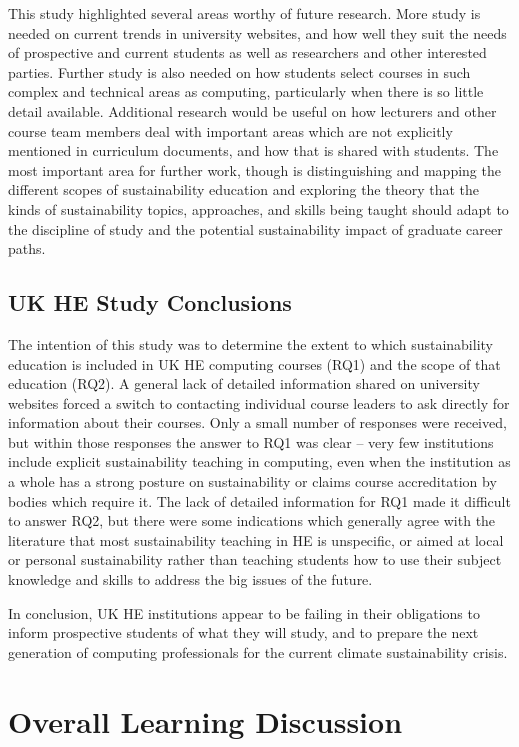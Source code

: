 This study highlighted several areas worthy of future research. More study is needed on current trends in university websites, and how well they suit the needs of prospective and current students as well as researchers and other interested parties. Further study is also needed on how students select courses in such complex and technical areas as computing, particularly when there is so little detail available. Additional research would be useful on how lecturers and other course team members deal with important areas which are not explicitly mentioned in curriculum documents, and how that is shared with students. The most important area for further work, though is distinguishing and mapping the different scopes of sustainability education and exploring the theory that the kinds of sustainability topics, approaches, and skills being taught should adapt to the discipline of study and the potential sustainability impact of graduate career paths.

\subsection*{UK HE Study Conclusions}

The intention of this study was to determine the extent to which sustainability education is included in UK HE computing courses (RQ1) and the scope of that education (RQ2). A general lack of detailed information shared on university websites forced a switch to contacting individual course leaders to ask directly for information about their courses. Only a small number of responses were received, but within those responses the answer to RQ1 was clear -- very few institutions include explicit sustainability teaching in computing, even when the institution as a whole has a strong posture on sustainability or claims course accreditation by bodies which require it. The lack of detailed information for RQ1 made it difficult to answer RQ2, but there were some indications which generally agree with the literature that most sustainability teaching in HE is unspecific, or aimed at local or personal sustainability rather than teaching students how to use their subject knowledge and skills to address the big issues of the future.

In conclusion, UK HE institutions appear to be failing in their obligations to inform prospective students of what they will study, and to prepare the next generation of computing professionals for the current climate sustainability crisis. 

\section*{Overall Learning Discussion}

